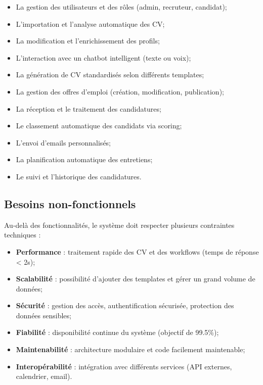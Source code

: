 \begin{itemize}
    \item La gestion des utilisateurs et des rôles (admin, recruteur, candidat);
    
    \item L'importation et l'analyse automatique des CV;
    
    \item La modification et l'enrichissement des profils;
    
    \item L'interaction avec un chatbot intelligent (texte ou voix);
    
    \item La génération de CV standardisés selon différents templates;
    
    \item La gestion des offres d'emploi (création, modification, publication);
    
    \item La réception et le traitement des candidatures;
    
    \item Le classement automatique des candidats via scoring;
    
    \item L'envoi d'emails personnalisés;
    
    \item La planification automatique des entretiens;
    
    \item Le suivi et l'historique des candidatures.
\end{itemize}


\subsection{Besoins non-fonctionnels}
\label{subsec:besoins-non-fonctionnels}

Au-delà des fonctionnalités, le système doit respecter plusieurs contraintes techniques :

\begin{itemize}
    \item \textbf{Performance} : traitement rapide des CV et des workflows (temps de réponse < 2s);
    
    \item \textbf{Scalabilité} : possibilité d'ajouter des templates et gérer un grand volume de données;
    
    \item \textbf{Sécurité} : gestion des accès, authentification sécurisée, protection des données sensibles;
    
    \item \textbf{Fiabilité} : disponibilité continue du système (objectif de 99.5\%);
    
    \item \textbf{Maintenabilité} : architecture modulaire et code facilement maintenable;
    
    \item \textbf{Interopérabilité} : intégration avec différents services (API externes, calendrier, email).
\end{itemize}


